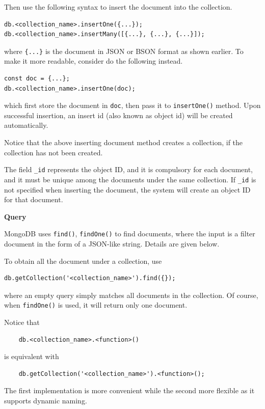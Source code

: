 Then use the following syntax to insert the document into the collection.
\begin{lstlisting}
db.<collection_name>.insertOne({...});
db.<collection_name>.insertMany([{...}, {...}, {...}]);
\end{lstlisting}
where \verb|{...}| is the document in JSON or BSON format as shown earlier. To make it more readable, consider do the following instead.
\begin{lstlisting}
const doc = {...};
db.<collection_name>.insertOne(doc);
\end{lstlisting}
which first store the document in \verb|doc|, then pass it to \verb|insertOne()| method. Upon successful insertion, an insert id (also known as object id) will be created automatically.

Notice that the above inserting document method creates a collection, if the collection has not been created.

The field \verb|_id| represents the object ID, and it is compulsory for each document, and it must be unique among the documents under the same collection. If \verb|_id| is not specified when inserting the document, the system will create an object ID for that document. 

\vspace{0.1in}
\noindent \textbf{Query}
\vspace{0.1in}

MongoDB uses \verb|find()|, \verb|findOne()| to find documents, where the input is a filter document in the form of a JSON-like string. Details are given below.

To obtain all the document under a collection, use
\begin{lstlisting}
db.getCollection('<collection_name>').find({});
\end{lstlisting}
where an empty query simply matches all documents in the collection. Of course, when \verb|findOne()| is used, it will return only one document.

\begin{shortbox}
Notice that
\begin{lstlisting}
	db.<collection_name>.<function>()
\end{lstlisting}
is equivalent with
\begin{lstlisting}
	db.getCollection('<collection_name>').<function>();
\end{lstlisting}
The first implementation is more convenient while the second more flexible as it supports dynamic naming.
\end{shortbox}

